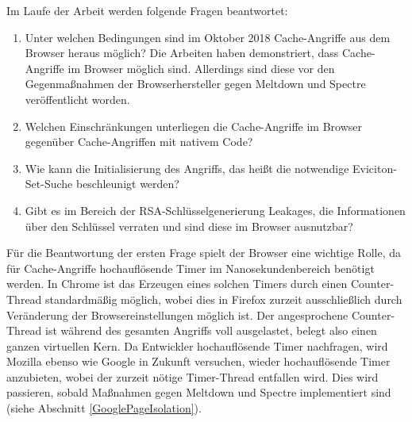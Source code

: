 
Im Laufe der Arbeit werden folgende Fragen beantwortet:

\begin{enumerate}
\item Unter welchen Bedingungen sind im Oktober 2018 Cache-Angriffe aus dem Browser heraus möglich?
Die Arbeiten \cite{TheSpyInTheSandbox,DriveByPaper,ASLROnTheLine} haben demonstriert, dass Cache-Angriffe im Browser möglich sind.
Allerdings sind diese vor den Gegenmaßnahmen der Browserhersteller gegen Meltdown und Spectre veröffentlicht worden.

\item Welchen Einschränkungen unterliegen die Cache-Angriffe im Browser gegenüber Cache-Angriffen mit nativem Code?

\item Wie kann die Initialisierung des Angriffs, das heißt die notwendige Eviciton-Set-Suche beschleunigt werden?

\item Gibt es im Bereich der RSA-Schlüsselgenerierung Leakages, die Informationen über den Schlüssel verraten und sind diese im Browser ausnutzbar?
\end{enumerate}


Für die Beantwortung der ersten Frage spielt der Browser eine wichtige Rolle, da für Cache-Angriffe hochauflösende Timer im Nanosekundenbereich benötigt werden.
In Chrome ist das Erzeugen eines solchen Timers durch einen Counter-Thread standardmäßig möglich, wobei dies in Firefox zurzeit ausschließlich durch Veränderung der Browsereinstellungen möglich ist.
Der angesprochene Counter-Thread ist während des gesamten Angriffs voll ausgelastet, belegt also einen ganzen virtuellen Kern.
Da Entwickler hochauflösende Timer nachfragen, wird Mozilla ebenso wie Google in Zukunft versuchen, wieder hochauflösende Timer anzubieten, wobei der zurzeit nötige Timer-Thread entfallen wird.
Dies wird passieren, sobald Maßnahmen gegen Meltdown und Spectre implementiert sind (siehe Abschnitt \ref{GooglePageIsolation}).




